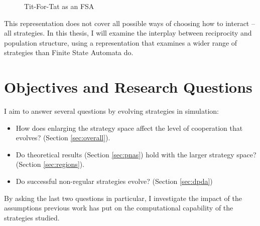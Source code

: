\documentclass[a4paper,11pt,bcshonoursthesis,singlespace,oneside,thesisdraft,pdflatex]{cssethesis}
\begin{document}
\begin{figure}
\center
{}
\caption{Tit-For-Tat as an FSA}
\label{fig:fsa.tft.lang}
\end{figure}

This representation does not cover all possible ways of choosing how to interact -- all strategies. In this thesis, I will examine the interplay between reciprocity and population structure, using a representation that examines a wider range of strategies than Finite State Automata do. 
\section{Objectives and Research Questions}
I aim to answer several questions by evolving strategies in simulation:
\begin{itemize}
\item How does enlarging the strategy space affect the level of cooperation that evolves? (Section \ref{sec:overall}). 
\item Do theoretical results (Section \ref{sec:pnas}) hold with the larger strategy space? (Section \ref{sec:regions}).
\item Do successful non-regular strategies evolve? (Section \ref{sec:dpda})
\end{itemize}
 
By asking the last two questions in particular, I investigate the impact of the assumptions previous work has put on the computational capability of the strategies studied. 
\end{document}
